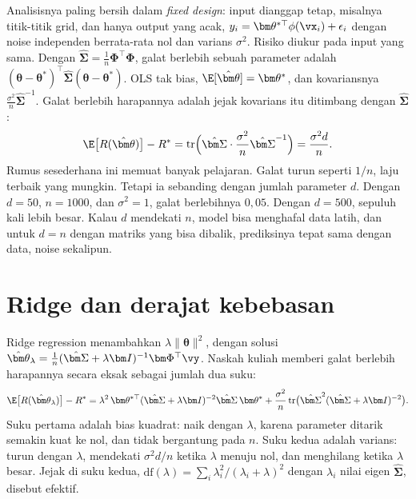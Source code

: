 Analisisnya paling bersih dalam \emph{fixed design}: input dianggap tetap, misalnya titik-titik grid, dan hanya output yang acak,
$y_i=\bm\theta^{*\top}\phi(\vx_i)+\epsilon_i$ dengan noise independen berrata-rata nol dan varians $\sigma^2$. Risiko diukur pada
input yang sama. Dengan $\hat{\bm\Sigma}=\tfrac1n\bm\Phi^\top\bm\Phi$, galat berlebih sebuah parameter adalah
$(\bm\theta-\bm\theta^*)^\top\hat{\bm\Sigma}(\bm\theta-\bm\theta^*)$. OLS tak bias, $\E[\hat{\bm\theta}]=\bm\theta^*$, dan kovariansnya
$\tfrac{\sigma^2}n\hat{\bm\Sigma}^{-1}$. Galat berlebih harapannya adalah jejak kovarians itu ditimbang dengan $\hat{\bm\Sigma}$:
\begin{equation}
\E\big[R(\hat{\bm\theta})\big]-R^*=\mathrm{tr}\Big(\hat{\bm\Sigma}\cdot\frac{\sigma^2}n\hat{\bm\Sigma}^{-1}\Big)=\frac{\sigma^2d}n .
\end{equation}
Rumus sesederhana ini memuat banyak pelajaran. Galat turun seperti $1/n$, laju terbaik yang mungkin. Tetapi ia sebanding dengan
jumlah parameter $d$. Dengan $d=50$, $n=1000$, dan $\sigma^2=1$, galat berlebihnya $0{,}05$. Dengan $d=500$, sepuluh kali lebih besar.
Kalau $d$ mendekati $n$, model bisa menghafal data latih, dan untuk $d=n$ dengan matriks yang bisa dibalik, prediksinya tepat sama
dengan data, noise sekalipun.

\section{Ridge dan derajat kebebasan}

Ridge regression menambahkan $\lambda\|\bm\theta\|^2$, dengan solusi $\hat{\bm\theta}_\lambda=\tfrac1n(\hat{\bm\Sigma}+\lambda\bm I)^{-1}\bm\Phi^\top\vy$.
Naskah kuliah memberi galat berlebih harapannya secara eksak sebagai jumlah dua suku:
\begin{equation}
\E\big[R(\hat{\bm\theta}_\lambda)\big]-R^*=\lambda^2\,\bm\theta^{*\top}(\hat{\bm\Sigma}+\lambda\bm I)^{-2}\hat{\bm\Sigma}\,\bm\theta^*
+\frac{\sigma^2}n\,\mathrm{tr}\big(\hat{\bm\Sigma}^2(\hat{\bm\Sigma}+\lambda\bm I)^{-2}\big).
\end{equation}
Suku pertama adalah bias kuadrat: naik dengan $\lambda$, karena parameter ditarik semakin kuat ke nol, dan tidak bergantung pada $n$.
Suku kedua adalah varians: turun dengan $\lambda$, mendekati $\sigma^2d/n$ ketika $\lambda$ menuju nol, dan menghilang ketika $\lambda$
besar. Jejak di suku kedua, $\mathrm{df}(\lambda)=\sum_i\lambda_i^2/(\lambda_i+\lambda)^2$ dengan $\lambda_i$ nilai eigen $\hat{\bm\Sigma}$,
disebut  efektif.

